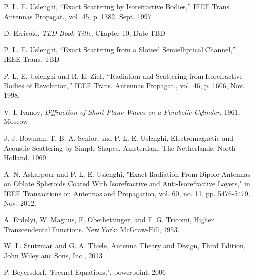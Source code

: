 
P. L. E. Uslenghi, “Exact Scattering by Isorefractive Bodies,”
IEEE Trans. Antennas Propagat., vol. 45, p. 1382, Sept. 1997.

D. Erricolo, \emph{TBD Book Title}, Chapter 10, Date TBD 

P. L. E. Uslenghi, “Exact Scattering from a Slotted Semielliptical Channel,”
IEEE Trans. TBD

P. L. E. Uslenghi and R. E. Zich, “Radiation and Scattering from 
Isorefractive Bodies of Revolution,” IEEE Trans. Antennas Propagat., vol. 46, p. 1606, Nov. 1998. 

V. I. Ivanov, \emph{Diffraction of Short Plane Waves on a Parabolic Cylinder}, 1961, Moscow

J. J. Bowman, T. B. A. Senior, and P. L. E. Uslenghi, Electromagnetic and Acoustic Scattering by Simple Shapes. Amsterdam, The Netherlands: North-Holland, 1969.

A. N. Askarpour and P. L. E. Uslenghi, "Exact Radiation From Dipole Antennas on Oblate Spheroids Coated With Isorefractive and Anti-Isorefractive Layers," in IEEE Transactions on Antennas and Propagation, vol. 60, no. 11, pp. 5476-5479, Nov. 2012.

A. Erdelyi, W. Magnus, F. Oberhettinger, and F. G. Tricomi, Higher
Transcendental Functions. New York: McGraw-Hill, 1953.

W. L. Stutzman and G. A. Thiele, Antenna Theory and Design, Third Edition, John Wiley and Sons, Inc., 2013

P. Beyersdorf,  "Fresnel Equations,", powerpoint, 2006

